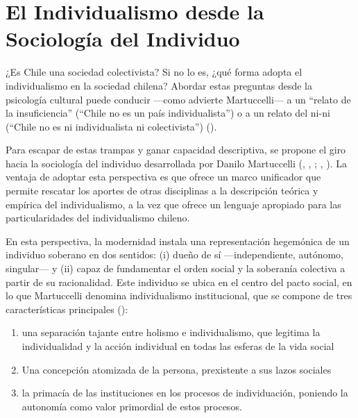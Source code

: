 \documentclass[
  letterpaper,
  DIV=11,
  numbers=noendperiod]{scrartcl}
\begin{document}
\section{El Individualismo desde la Sociología del
Individuo}\label{el-individualismo-desde-la-sociologuxeda-del-individuo}

¿Es Chile una sociedad colectivista? Si no lo es, ¿qué forma adopta el
individualismo en la sociedad chilena? Abordar estas preguntas desde la
psicología cultural puede conducir ---como advierte Martuccelli--- a un
``relato de la insuficiencia'' (``Chile no es un país individualista'')
o a un relato del ni-ni (``Chile no es ni individualista ni
colectivista'') ().

Para escapar de estas trampas y ganar capacidad descriptiva, se propone
el giro hacia la sociología del individuo desarrollada por Danilo
Martuccelli (,
, ;
,
). La ventaja de adoptar esta
perspectiva es que ofrece un marco unificador que permite rescatar los
aportes de otras disciplinas a la descripción teórica y empírica del
individualismo, a la vez que ofrece un lenguaje apropiado para las
particularidades del individualismo chileno.

En esta perspectiva, la modernidad instala una representación hegemónica
de un individuo soberano en dos sentidos: (i) dueño de sí
---independiente, autónomo, singular--- y (ii) capaz de fundamentar el
orden social y la soberanía colectiva a partir de su racionalidad. Este
individuo se ubica en el centro del pacto social, en lo que Martuccelli
denomina individualismo institucional, que se compone de tres
características principales ():

\begin{enumerate}
\def\labelenumi{\roman{enumi})}
\item
  una separación tajante entre holismo e individualismo, que legitima la
  individualidad y la acción individual en todas las esferas de la vida
  social
\item
  Una concepción atomizada de la persona, prexistente a sus lazos
  sociales
\item
  la primacía de las instituciones en los procesos de individuación,
  poniendo la autonomía como valor primordial de estos procesos.
\end{enumerate}
\end{document}
